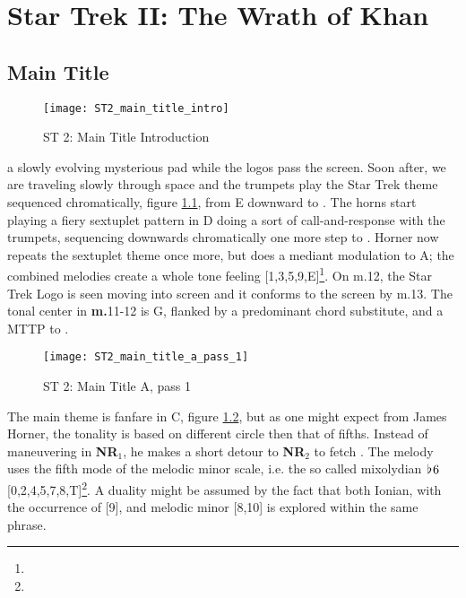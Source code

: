 
\chapter{Star Trek II: The Wrath of Khan}

\section{Main Title}\label{sec:st 2 main title}
\begin{figure}[h!]
\texttt{[image: ST2\_main\_title\_intro]}
	\caption{ST 2: Main Title Introduction}
	\label{ST2_main_title_intro}
\end{figure}
\noindent{} a slowly evolving mysterious pad while the logos pass the screen. Soon after, we are traveling slowly through space and the trumpets play the Star Trek theme sequenced chromatically, figure \ref{ST2_main_title_intro}, from E downward to \eflat. The horns start playing a fiery sextuplet pattern in D doing a sort of call-and-response with the trumpets, sequencing downwards chromatically one more step to \dflat. Horner now repeats the sextuplet theme once more, but does a mediant modulation to A; the combined melodies create a whole tone feeling [1,3,5,9,E]\footnote{}. On m.12, the Star Trek Logo is seen moving into screen and it conforms to the screen by m.13. The tonal center in \textbf{m.}11-12 is G, flanked by a predominant chord substitute, \aflat and a \acf{MTTP} to \dflat.



\begin{figure}[h!]
\center
\texttt{[image: ST2\_main\_title\_a\_pass\_1]}
	\caption{ST 2: Main Title A, pass 1}
	\label{ST2_main_title_a_pass_1}
\end{figure}

The main theme is fanfare in C, figure \ref{ST2_main_title_a_pass_1}, but as one might expect from James Horner, the tonality is based on different circle then that of fifths. Instead of maneuvering in \textbf{NR\(_{1}\)}, he makes a short detour to \textbf{NR\(_{2}\)} to fetch \gflat. The melody uses the fifth mode of the melodic minor scale, i.e. the so called mixolydian \(\hspace*{0.18ex}\flat\hspace*{0.18ex}{6}\) [0,2,4,5,7,8,T]\footnote{}. A duality might be assumed by the fact that both Ionian, with the occurrence of [9], and melodic minor [8,10] is explored within the same phrase. 

